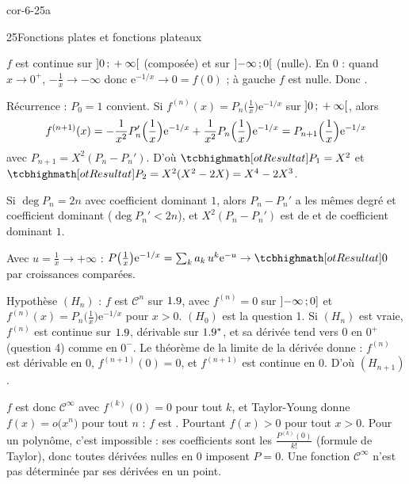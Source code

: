 
\begin{blocLivre}{cor-6-25a}
\begin{corrige}{25}{Fonctions plates et fonctions plateaux}
\begin{questions}
  \item $f$ est continue sur $\mathopen{]}0\,{;}\,+\infty\mathclose{[}$ (composée) et sur
    $\mathopen{]}-\infty\,{;}\,0\mathclose{[}$ (nulle). En $0$ : quand $x\to0^{+}$,
    $-\frac1x\to-\infty$ donc $\mathrm{e}^{-1/x}\to0=f(0)$ ; à gauche $f$
    est nulle. Donc .
  \item Récurrence : $P_0=1$ convient. Si
    $f^{(n)}(x)=P_n\bigl(\frac1x\bigr)\mathrm{e}^{-1/x}$ sur
    $\mathopen{]}0\,{;}\,+\infty\mathclose{[}$, alors
    \[
    f^{(n+1)}(x)=-\frac{1}{x^{2}}P_n'\Bigl(\frac1x\Bigr)\mathrm{e}^{-1/x}
    +\frac{1}{x^{2}}P_n\Bigl(\frac1x\Bigr)\mathrm{e}^{-1/x}
    =P_{n+1}\Bigl(\frac1x\Bigr)\mathrm{e}^{-1/x}
    \]
    avec $P_{n+1}=X^{2}(P_n-P_n')$. D'où $\res{P_1=X^{2}}$ et
    $\res{P_2=X^{2}(X^{2}-2X)=X^{4}-2X^{3}}$.
  \item Si $\deg P_n=2n$ avec coefficient dominant $1$, alors
    $P_n-P_n'$ a les mêmes degré et coefficient dominant
    ($\deg P_n'<2n$), et $X^{2}(P_n-P_n')$ est de 
    et de coefficient dominant $1$.
\end{questions}
\begin{questions}[resume]
  \item Avec $u=\frac1x\to+\infty$ :
    $P\bigl(\frac1x\bigr)\mathrm{e}^{-1/x}=\sum_k a_k\,u^{k}\mathrm{e}^{-u}\to\res{0}$
    par croissances comparées.
  \item Hypothèse $(H_n)$ : $f$ est $\mathcal{C}^{n}$ sur $1.9$, avec
    $f^{(n)}=0$ sur $\mathopen{]}-\infty\,{;}\,0\mathclose{]}$ et
    $f^{(n)}(x)=P_n\bigl(\frac1x\bigr)\mathrm{e}^{-1/x}$ pour $x>0$.
    $(H_0)$ est la question 1. Si $(H_n)$ est vraie, $f^{(n)}$ est continue
    sur $1.9$, dérivable sur $1.9^{*}$, et sa dérivée tend vers $0$ en
    $0^{+}$ (question 4) comme en $0^{-}$. Le théorème de la limite de la
    dérivée donne : $f^{(n)}$ est dérivable en $0$, $f^{(n+1)}(0)=0$, et
    $f^{(n+1)}$ est continue en $0$. D'où $(H_{n+1})$.
  \item $f$ est donc $\mathcal{C}^{\infty}$ avec $f^{(k)}(0)=0$ pour tout
    $k$, et Taylor-Young donne $f(x)=o\bigl(x^{n}\bigr)$ pour tout $n$ :
    $f$ est . Pourtant $f(x)>0$ pour tout $x>0$.
    Pour un polynôme, c'est impossible : ses coefficients sont les
    $\frac{P^{(k)}(0)}{k!}$ (formule de Taylor), donc toutes dérivées
    nulles en $0$ imposent $P=0$. Une fonction $\mathcal{C}^{\infty}$
    n'est pas déterminée par ses dérivées en un point.
\end{questions}
\end{corrige}
\end{blocLivre}

